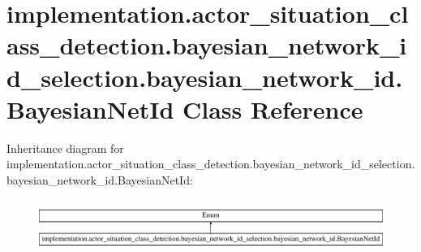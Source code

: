 \hypertarget{classimplementation_1_1actor__situation__class__detection_1_1bayesian__network__id__selection_1_c01f1dacd43bed2d1110fc7cec61e664}{}\section{implementation.\+actor\+\_\+situation\+\_\+class\+\_\+detection.\+bayesian\+\_\+network\+\_\+id\+\_\+selection.\+bayesian\+\_\+network\+\_\+id.\+Bayesian\+Net\+Id Class Reference}
\label{classimplementation_1_1actor__situation__class__detection_1_1bayesian__network__id__selection_1_c01f1dacd43bed2d1110fc7cec61e664}
Inheritance diagram for implementation.\+actor\+\_\+situation\+\_\+class\+\_\+detection.\+bayesian\+\_\+network\+\_\+id\+\_\+selection.\+bayesian\+\_\+network\+\_\+id.\+Bayesian\+Net\+Id\+:\begin{figure}[H]
\begin{center}
\leavevmode
\includegraphics[height=1.671642cm]{classimplementation_1_1actor__situation__class__detection_1_1bayesian__network__id__selection_1_c01f1dacd43bed2d1110fc7cec61e664}
\end{center}
\end{figure}
